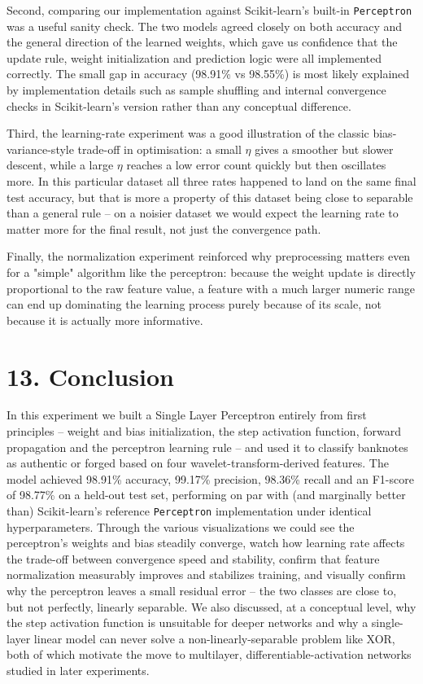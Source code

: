 \documentclass[11pt]{article}
\begin{document}
Second, comparing our implementation against Scikit-learn's built-in \texttt{Perceptron} was a useful sanity check. The two models agreed closely on both accuracy and the general direction of the learned weights, which gave us confidence that the update rule, weight initialization and prediction logic were all implemented correctly. The small gap in accuracy (98.91\% vs 98.55\%) is most likely explained by implementation details such as sample shuffling and internal convergence checks in Scikit-learn's version rather than any conceptual difference.

Third, the learning-rate experiment was a good illustration of the classic bias-variance-style trade-off in optimisation: a small $\eta$ gives a smoother but slower descent, while a large $\eta$ reaches a low error count quickly but then oscillates more. In this particular dataset all three rates happened to land on the same final test accuracy, but that is more a property of this dataset being close to separable than a general rule -- on a noisier dataset we would expect the learning rate to matter more for the final result, not just the convergence path.

Finally, the normalization experiment reinforced why preprocessing matters even for a "simple" algorithm like the perceptron: because the weight update is directly proportional to the raw feature value, a feature with a much larger numeric range can end up dominating the learning process purely because of its scale, not because it is actually more informative.

\section*{13. Conclusion}

In this experiment we built a Single Layer Perceptron entirely from first principles -- weight and bias initialization, the step activation function, forward propagation and the perceptron learning rule -- and used it to classify banknotes as authentic or forged based on four wavelet-transform-derived features. The model achieved 98.91\% accuracy, 99.17\% precision, 98.36\% recall and an F1-score of 98.77\% on a held-out test set, performing on par with (and marginally better than) Scikit-learn's reference \texttt{Perceptron} implementation under identical hyperparameters. Through the various visualizations we could see the perceptron's weights and bias steadily converge, watch how learning rate affects the trade-off between convergence speed and stability, confirm that feature normalization measurably improves and stabilizes training, and visually confirm why the perceptron leaves a small residual error -- the two classes are close to, but not perfectly, linearly separable. We also discussed, at a conceptual level, why the step activation function is unsuitable for deeper networks and why a single-layer linear model can never solve a non-linearly-separable problem like XOR, both of which motivate the move to multilayer, differentiable-activation networks studied in later experiments.
\end{document}

